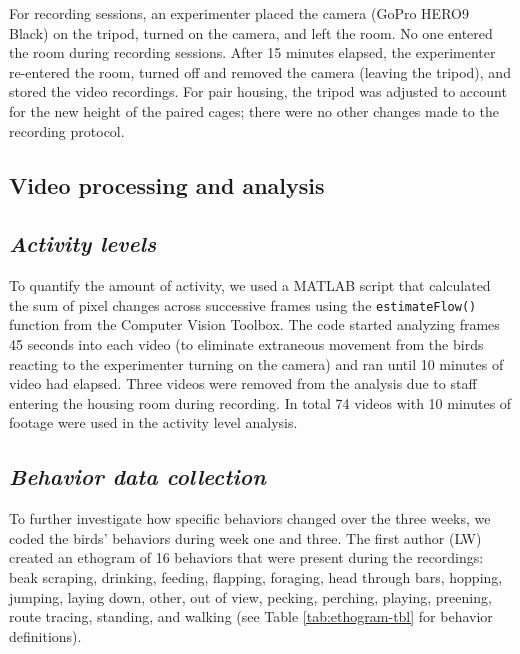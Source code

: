 \documentclass[
  pub]{apa6}
\begin{document}
For recording sessions, an experimenter placed the camera (GoPro HERO9 Black) on the tripod, turned on the camera, and left the room. No one entered the room during recording sessions. After 15 minutes elapsed, the experimenter re-entered the room, turned off and removed the camera (leaving the tripod), and stored the video recordings. For pair housing, the tripod was adjusted to account for the new height of the paired cages; there were no other changes made to the recording protocol.

\hypertarget{video-processing-and-analysis}{%
\subsection{Video processing and analysis}\label{video-processing-and-analysis}}

\hypertarget{activity-levels}{%
\subsection{\texorpdfstring{\emph{Activity levels}}{Activity levels}}\label{activity-levels}}

To quantify the amount of activity, we used a MATLAB script that calculated the sum of pixel changes across successive frames using the \texttt{estimateFlow()} function from the Computer Vision Toolbox. The code started analyzing frames 45 seconds into each video (to eliminate extraneous movement from the birds reacting to the experimenter turning on the camera) and ran until 10 minutes of video had elapsed. Three videos were removed from the analysis due to staff entering the housing room during recording. In total 74 videos with 10 minutes of footage were used in the activity level analysis.

\hypertarget{behavior-data-collection}{%
\subsection{\texorpdfstring{\emph{Behavior data collection}}{Behavior data collection}}\label{behavior-data-collection}}

To further investigate how specific behaviors changed over the three weeks, we coded the birds' behaviors during week one and three. The first author (LW) created an ethogram of 16 behaviors that were present during the recordings: beak scraping, drinking, feeding, flapping, foraging, head through bars, hopping, jumping, laying down, other, out of view, pecking, perching, playing, preening, route tracing, standing, and walking (see Table \ref{tab:ethogram-tbl} for behavior definitions).
\end{document}
